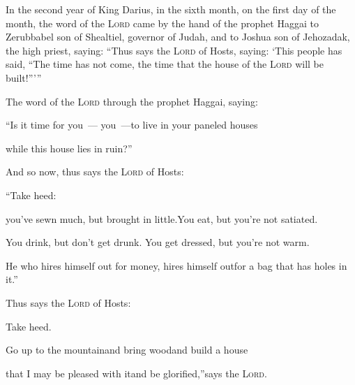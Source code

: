 
\begin{inparaenum}
   In the second year of King Darius, in the sixth month, on the first day of the month, the word of the \textsc{Lord} came by the hand of the prophet Haggai to Zerubbabel son of Shealtiel, governor of Judah, and to Joshua son of Jehozadak, the high priest, saying:%
   ``Thus says the \textsc{Lord} of Hosts, saying: `This people has said, ``The time has not come, the time that the house of the \textsc{Lord} will be built!''\thinspace'\thinspace''%
  
   The word of the \textsc{Lord} through the prophet Haggai, saying:\smallskip%
  
  \pc {} ``Is it time for you~--- you~---\pa to live in your paneled houses%
  
  \pd while this house lies in ruin?''%
  
  \pc {} And so now, thus says the \textsc{Lord} of Hosts:%
  
  \pd ``Take heed:%
  
  \pc {} you've sewn much, but brought in little.\pa You eat, but you're not satiated.%
  
  \pd You drink, but don't get drunk.%
  \pa You get dressed, but you're not warm.%
  
  \pd He who hires himself out for money, hires himself out\pa for a bag that has holes in it.''\bigskip%
  
   Thus says the \textsc{Lord} of Hosts:\smallskip%
  
  \pd Take heed.%
  
  \pc {} Go up to the mountain\pa and bring wood\pa and build a house%
  
  \pd that I may be pleased with it\pa and be glorified,''\pa says the \textsc{Lord}.%
  

\end{inparaenum}
